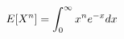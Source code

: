 \documentclass[preview]{standalone}
\begin{document}
\begin{align*}
\special{dvisvgm:raw <g id='unique000'>}E[X^n]=\displaystyle\int_0^{\infty}x^ne^{-x}dx\special{dvisvgm:raw </g>}
\end{align*}
\end{document}
